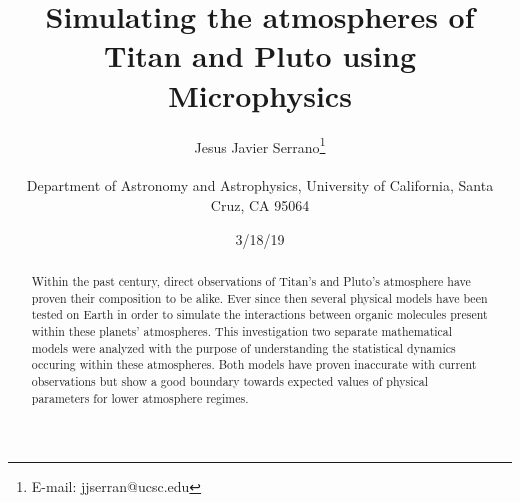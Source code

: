 \documentclass[useAMS,natbib]{mn2e}
\title[Measuring Column Density of Neutral Hydrogen near the Galactic Center of the Milky Way] {Simulating the atmospheres of Titan and Pluto using Microphysics}
\author[Jesus Javier Serrano]{Jesus Javier Serrano\thanks{E-mail:
jjserran@ucsc.edu}\\
\\Department of Astronomy and Astrophysics, University of California, Santa Cruz, CA 95064
}
\begin{document}
\date{3/18/19}

\pagerange{\pageref{firstpage}--\pageref{lastpage}} 

\maketitle

\label{firstpage}

\begin{abstract} %
Within the past century, direct observations of Titan's and Pluto's atmosphere have proven their composition to be alike. Ever since then several physical models have been tested on Earth in order to simulate the interactions between organic molecules present within these planets' atmospheres. This investigation two separate mathematical models were analyzed with the purpose of understanding the statistical dynamics occuring within these atmospheres. Both models have proven inaccurate with current observations but show a good boundary towards expected values of physical parameters for lower atmosphere regimes.
\end{abstract}
\end{document}
